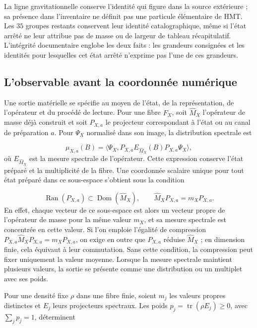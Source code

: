 La ligne gravitationnelle conserve l’identité qui figure dans la source extérieure ;
sa présence dans l’inventaire ne définit pas une particule élémentaire de HMT.
Les \(35\) groupes restants conservent leur identité catalographique, même si
l’état arrêté ne leur attribue pas de masse ou de largeur de tableau récapitulatif. L’intégrité
documentaire englobe les deux faits : les grandeurs consignées et les identités
pour lesquelles cet état arrêté n’exprime pas l’une de ces grandeurs.


\subsection{L’observable avant la coordonnée numérique
}
\label{subsec:vi-tipos-observable}

Une sortie matérielle se spécifie au moyen de l’état, de la représentation,
de l’opérateur et du procédé de lecture. Pour une fibre \(F_X\), soit
\(\widehat M_X\) l’opérateur de masse déjà construit et soit \(P_{X,a}\)
le projecteur correspondant à l’état ou au canal de préparation \(a\).
Pour \(\Psi_X\) normalisé dans son image, la distribution spectrale est

\[
 \mu_{X,a}(B)
 =\langle\Psi_X,
   P_{X,a}E_{\widehat M_X}(B)P_{X,a}\Psi_X\rangle,
\]
où \(E_{\widehat M_X}\) est la mesure spectrale de l’opérateur. Cette
expression conserve l’état préparé et la multiplicité de la fibre.
Une coordonnée scalaire unique pour tout état préparé dans ce sous-espace
s’obtient sous la condition

\[
 \operatorname{Ran}(P_{X,a})\subset\operatorname{Dom}(\widehat M_X),
 \qquad \widehat M_XP_{X,a}=m_XP_{X,a}.
\]
En effet, chaque vecteur de ce sous-espace est alors un vecteur propre de
l’opérateur de masse pour la même valeur \(m_X\), et sa mesure spectrale est
concentrée en cette valeur. Si l’on emploie l’égalité de compression
\(P_{X,a}\widehat M_XP_{X,a}=m_XP_{X,a}\), on exige en outre que
\(P_{X,a}\) réduise \(\widehat M_X\) ; en dimension finie, cela équivaut
à leur commutation. Sans cette condition, la compression peut fixer uniquement
la valeur moyenne. Lorsque la mesure spectrale maintient plusieurs valeurs, la
sortie se présente comme une distribution ou un multiplet avec ses poids.


Pour une densité fixe \(\rho\) dans une fibre finie, soient \(m_j\)
les valeurs propres distinctes et \(E_j\) leurs projecteurs spectraux.
Les poids \(p_j=\operatorname{tr}(\rho E_j)\geq0\), avec
\(\sum_jp_j=1\), déterminent


